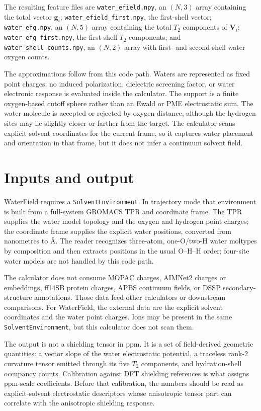 \documentclass[11pt]{article}
\begin{document}
The resulting feature files are \texttt{water\_efield.npy}, an
\((N,3)\) array containing the total vector \(\bm g_i\);
\texttt{water\_efield\_first.npy}, the first-shell vector;
\texttt{water\_efg.npy}, an \((N,5)\) array containing the total \(T_2\)
components of \(\bm V_i\); \texttt{water\_efg\_first.npy}, the first-shell
\(T_2\) components; and \texttt{water\_shell\_counts.npy}, an \((N,2)\) array
with first- and second-shell water oxygen counts.

The approximations follow from this code path. Waters are represented as fixed
point charges; no induced polarization, dielectric screening factor, or water
electronic response is evaluated inside the calculator. The support is a
finite oxygen-based cutoff sphere rather than an Ewald or PME electrostatic
sum. The water molecule is accepted or rejected by oxygen distance, although
the hydrogen sites may lie slightly closer or farther from the target. The
calculator scans explicit solvent coordinates for the current frame, so it
captures water placement and orientation in that frame, but it does not infer a
continuum solvent field.

\section{Inputs and output}

WaterField requires a \texttt{SolventEnvironment}. In trajectory mode that
environment is built from a full-system GROMACS TPR and coordinate frame. The
TPR supplies the water model topology and the oxygen and hydrogen point
charges; the coordinate frame supplies the explicit water positions, converted
from nanometres to \(\si{\angstrom}\). The reader recognizes three-atom,
one-O/two-H water moltypes by composition and then extracts positions in the
usual O--H--H order; four-site water models are not handled by this code path.

The calculator does not consume MOPAC charges, AIMNet2 charges or embeddings,
ff14SB protein charges, APBS continuum fields, or DSSP secondary-structure
annotations. Those data feed other calculators or downstream comparisons.
For WaterField, the external data are the explicit solvent coordinates and the
water point charges.
Ions may be present in the same \texttt{SolventEnvironment}, but this
calculator does not scan them.

The output is not a shielding tensor in ppm. It is a set of field-derived
geometric quantities: a vector slope of the water electrostatic potential, a
traceless rank-2 curvature tensor emitted through its five \(T_2\) components,
and hydration-shell occupancy counts. Calibration against DFT shielding
references is what assigns ppm-scale coefficients. Before that calibration, the
numbers should be read as explicit-solvent electrostatic descriptors whose
anisotropic tensor part can correlate with the anisotropic shielding response.
\end{document}
